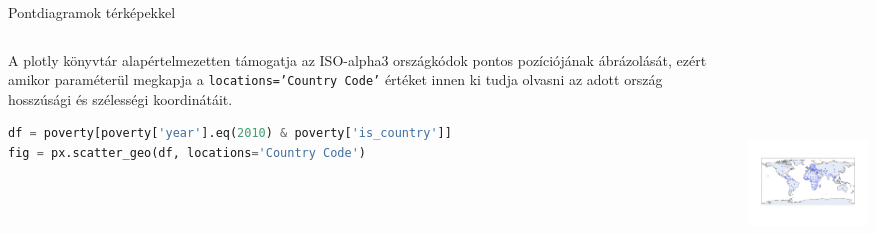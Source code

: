 \documentclass[english, aspectratio=169]{beamer}
\begin{document}
\begin{frame}[fragile]{Pontdiagramok térképekkel}
	\begin{columns}
		\begin{column}{.5\textwidth}
			A plotly könyvtár alapértelmezetten támogatja az ISO-alpha3 országkódok pontos pozíciójának ábrázolását, ezért amikor paraméterül megkapja a \texttt{locations='Country Code'} értéket innen ki tudja olvasni az adott ország hosszúsági és szélességi koordinátáit.\par\smallskip
			\begin{lstlisting}[language=python]
df = poverty[poverty['year'].eq(2010) & poverty['is_country']]
fig = px.scatter_geo(df, locations='Country Code')				
			\end{lstlisting}
		\end{column}
		\begin{column}{.5\textwidth}
			\begin{center}
				\includegraphics[width=7cm, height=7cm, keepaspectratio]{images/scatter_29.png}
			\end{center}
		\end{column}
	\end{columns}
\end{frame}
\end{document}
